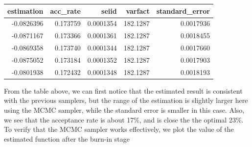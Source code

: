 \begin{center}
\begin{knitrout}
\color{fgcolor}
\begin{tabular}{r|r|r|r|r}
\hline
estimation & acc\_rate & seiid & varfact & standard\_error\\
\hline
-0.0826396 & 0.173759 & 0.0001354 & 182.1287 & 0.0017936\\
\hline
-0.0871167 & 0.173366 & 0.0001361 & 182.1287 & 0.0018455\\
\hline
-0.0869358 & 0.173740 & 0.0001344 & 182.1287 & 0.0017660\\
\hline
-0.0875052 & 0.173184 & 0.0001352 & 182.1287 & 0.0017903\\
\hline
-0.0801938 & 0.172432 & 0.0001348 & 182.1287 & 0.0018193\\
\hline
\end{tabular}


\end{knitrout}
\end{center}
From the table above, we can first notice that the estimated result is consistent with the previous samplers, but the range of the estimation is slightly larger here using the MCMC sampler, while the standard error is smaller in this case. Also, we see that the acceptance rate is about 17\%, and is close the the optimal 23\%. To verify that the MCMC sampler works effectively, we plot the value of the estimated function after the burn-in stage
